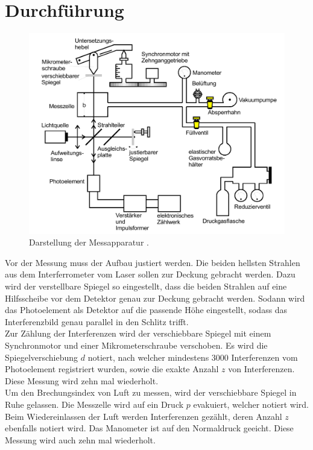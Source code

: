 \section{Durchführung}
\label{sec:Durchführung}

\begin{figure}
    \centering
    \includegraphics[width=12cm]{data/abb4.png}
    \caption{Darstellung der Messapparatur \cite{sample}.}
    \label{fig:abb4}
\end{figure}
\FloatBarrier

Vor der Messung muss der Aufbau justiert werden.
Die beiden hellsten Strahlen aus dem Interferrometer vom Laser sollen zur Deckung gebracht werden.
Dazu wird der verstellbare Spiegel so eingestellt, dass die beiden Strahlen auf eine Hilfsscheibe vor dem Detektor genau zur Deckung gebracht werden.
Sodann wird das Photoelement als Detektor auf die passende Höhe eingestellt, sodass das Interferenzbild genau parallel in den Schlitz trifft.
\\
Zur Zählung der Interferenzen wird der verschiebbare Spiegel mit einem Synchronmotor und einer Mikrometerschraube verschoben.
Es wird die Spiegelverschiebung $d$ notiert, nach welcher mindestens 3000 Interferenzen vom Photoelement registriert wurden, sowie die exakte Anzahl $z$ von Interferenzen.
Diese Messung wird zehn mal wiederholt.
\\
Um den Brechungsindex von Luft zu messen, wird der verschiebbare Spiegel in Ruhe gelassen.
Die Messzelle wird auf ein Druck $p$ evakuiert, welcher notiert wird.
Beim Wiedereinlassen der Luft werden Interferenzen gezählt, deren Anzahl $z$ ebenfalls notiert wird.
Das Manometer ist auf den Normaldruck geeicht.
Diese Messung wird auch zehn mal wiederholt.
